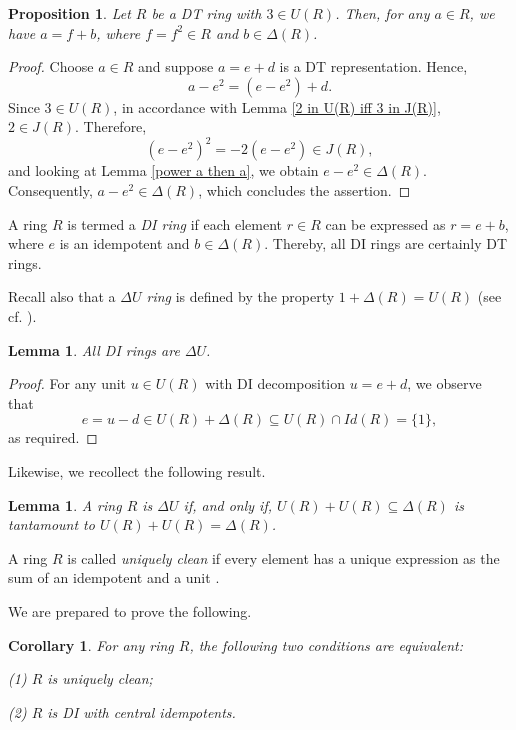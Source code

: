 \documentclass[12pt]{amsart}
\newtheorem{proposition}[theorem]{Proposition}
\newtheorem{lemma}[theorem]{Lemma}
\newtheorem{corollary}[theorem]{Corollary}
\theoremstyle{definition}
\begin{document}
\begin{proposition}\label{R is sum idempotent and delta}
Let $R$ be a DT ring with $3 \in U(R)$. Then, for any $a \in R$, we have $a = f + b$, where $f = f^2 \in R$ and $b \in \Delta(R)$.
\end{proposition}

\begin{proof}
Choose $a \in R$ and suppose $a = e + d$ is a DT representation. Hence,
\[
a - e^2 = (e - e^2) + d.
\]
Since $3 \in U(R)$, in accordance with Lemma \ref{2 in U(R) iff 3 in J(R)}, $2 \in J(R)$. Therefore,
\[
(e - e^2)^2 = -2(e - e^2) \in J(R),
\]
and looking at Lemma \ref{power a then a}, we obtain $e - e^2 \in \Delta(R)$. Consequently, $a - e^2 \in \Delta(R)$, which concludes the assertion.
\end{proof}

A ring \(R\) is termed a {\it DI ring} if each element \(r \in R\) can be expressed as \(r = e + b\), where \(e\) is an idempotent and \(b \in \Delta(R)\). Thereby, all DI rings are certainly DT rings.

Recall also that a {\it \(\Delta U\) ring} is defined by the property \(1 + \Delta(R) = U(R)\) (see cf. \cite{kkqt}).

\begin{lemma}\label{GDI is DU}
All DI rings are \(\Delta U\).
\end{lemma}

\begin{proof}
For any unit \(u \in U(R)\) with DI decomposition \(u = e + d\), we observe that \[e = u - d \in U(R) + \Delta(R) \subseteq U(R) \cap Id(R) = \{1\},\] as required.
\end{proof}

Likewise, we recollect the following result.

\begin{lemma}\cite[Proposition 2.3]{kkqt} \label{sum unit}
A ring \(R\) is \(\Delta U\) if, and only if, \(U(R) + U(R) \subseteq \Delta(R)\) is tantamount to \(U(R) + U(R) = \Delta(R)\).
\end{lemma}

A ring \(R\) is called {\it uniquely clean} if every element has a unique expression as the sum of an idempotent and a unit \cite{nzu}.

\medskip

We are prepared to prove the following.

\begin{corollary}\label{cor 2}
For any ring \(R\), the following two conditions are equivalent:

(1) \(R\) is uniquely clean;

(2) \(R\) is DI with central idempotents.
\end{corollary}
\end{document}
